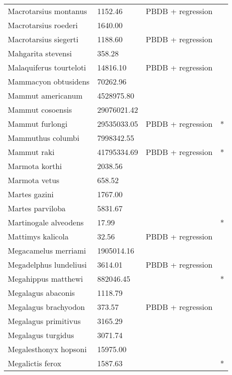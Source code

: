 \documentclass{article}
\begin{document}
\begin{center}
\begin{longtable}{p{} p{} p{} p{}}
    Macrotarsius montanus & 1152.46 & PBDB + regression &  \\ 
    Macrotarsius roederi & 1640.00 & \cite{Soligo2006} &  \\ 
    Macrotarsius siegerti & 1188.60 & PBDB + regression &  \\ 
    Mahgarita stevensi & 358.28 & \cite{Wortman1893} &  \\ 
    Malaquiferus tourteloti & 14816.10 & PBDB + regression &  \\ 
    Mammacyon obtusidens & 70262.96 & \cite{Tomiya2013} &  \\ 
    Mammut americanum & 4528975.80 & \cite{Smith2004} &  \\ 
    Mammut cosoensis & 29076021.42 & \cite{Secord2008a} &  \\ 
    Mammut furlongi & 29535033.05 & PBDB + regression & * \\ 
    Mammuthus columbi & 7998342.55 & \cite{Smith2004} &  \\ 
    Mammut raki & 41795334.69 & PBDB + regression & * \\ 
    Marmota korthi & 2038.56 & \cite{Tomiya2013} &  \\ 
    Marmota vetus & 658.52 & \cite{Tomiya2013} &  \\ 
    Martes gazini & 1767.00 & \cite{McKenna2011} &  \\ 
    Martes parviloba & 5831.67 & \cite{Macdonald1951} &  \\ 
    Martinogale alveodens & 17.99 & \cite{Tomiya2013} & * \\ 
    Mattimys kalicola & 32.56 & PBDB + regression &  \\ 
    Megacamelus merriami & 1905014.16 & \cite{Tomiya2013} &  \\ 
    Megadelphus lundeliusi & 3614.01 & PBDB + regression &  \\ 
    Megahippus matthewi & 882046.45 & \cite{Tomiya2013} & * \\ 
    Megalagus abaconis & 1118.79 & \cite{Tomiya2013} &  \\ 
    Megalagus brachyodon & 373.57 & PBDB + regression &  \\ 
    Megalagus primitivus & 3165.29 & \cite{Tomiya2013} &  \\ 
    Megalagus turgidus & 3071.74 & \cite{Tomiya2013} &  \\ 
    Megalesthonyx hopsoni & 15975.00 & \cite{Hay1916} &  \\ 
    Megalictis ferox & 1587.63 & \cite{Tomiya2013} & * \\ 

\end{longtable}
\end{center}
\end{document}
